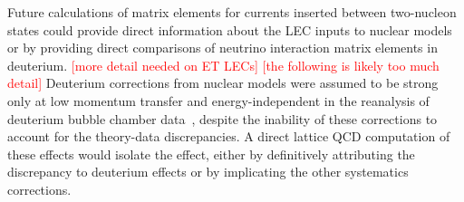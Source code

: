 Future calculations of matrix elements for currents inserted between
 two-nucleon states could provide direct information about the LEC inputs to nuclear
 models~\cite{Drischler:2019xuo}
 or by providing direct comparisons of neutrino interaction matrix elements in deuterium.
\textcolor{red}{[more detail needed on ET LECs]}
\textcolor{red}{[the following is likely too much detail]}
Deuterium corrections from nuclear models were assumed to be strong only at low momentum transfer
 and energy-independent in the reanalysis of deuterium bubble chamber data~\cite{Meyer:2016oeg},
 despite the inability of these corrections to account for the theory-data discrepancies.
A direct lattice QCD computation of these effects would isolate the effect,
 either by definitively attributing the discrepancy to deuterium effects
 or by implicating the other systematics corrections.

